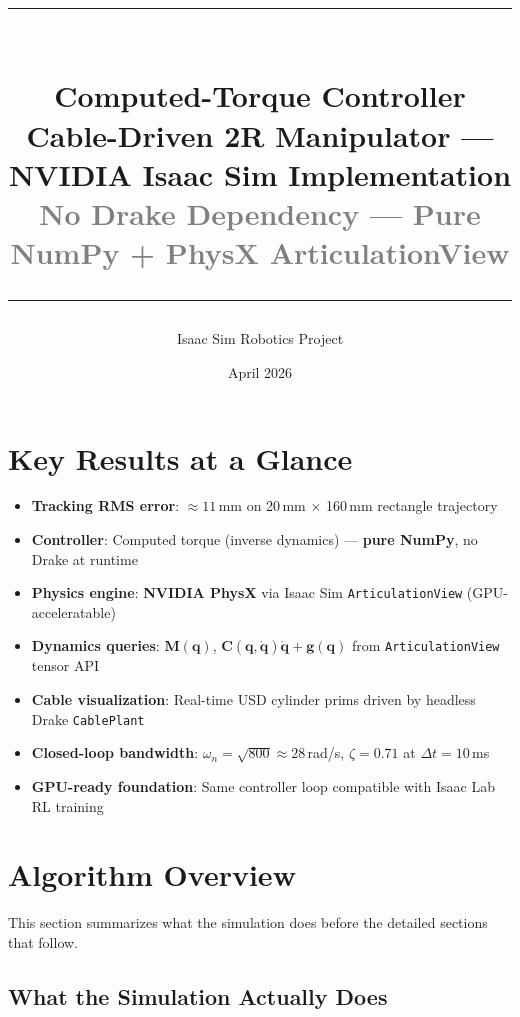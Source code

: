 \documentclass[11pt,a4paper]{article}
\title{%
    \textcolor{isaacorg}{\rule{\linewidth}{1.5pt}}\\[0.4cm]
    {\Huge\bfseries Computed-Torque Controller}\\[0.3cm]
    {\Large\textcolor{isaaccyan}{Cable-Driven 2R Manipulator --- NVIDIA Isaac Sim Implementation}}\\[0.1cm]
    {\large\textcolor{gray}{No Drake Dependency --- Pure NumPy + PhysX ArticulationView}}\\[0.2cm]
    \textcolor{isaacorg}{\rule{\linewidth}{1.5pt}}
}
\author{Isaac Sim Robotics Project}
\date{April 2026}
\newcommand{\bq}{\bm{q}}
\newcommand{\bdq}{\dot{\bm{q}}}
\newcommand{\bM}{\bm{M}}
\begin{document}
\maketitle
\thispagestyle{empty}

\section*{Key Results at a Glance}

\begin{resultbox}
\begin{itemize}[leftmargin=1.5em]
    \item \textbf{Tracking RMS error}: $\approx 11$\,mm on 20\,mm $\times$ 160\,mm rectangle trajectory
    \item \textbf{Controller}: Computed torque (inverse dynamics) --- \textbf{pure NumPy}, no Drake at runtime
    \item \textbf{Physics engine}: \textbf{NVIDIA PhysX} via Isaac Sim \texttt{ArticulationView} (GPU-acceleratable)
    \item \textbf{Dynamics queries}: $\bM(\bq)$, $\bm{C}(\bq,\bdq)\bdq + \bm{g}(\bq)$ from \texttt{ArticulationView} tensor API
    \item \textbf{Cable visualization}: Real-time USD cylinder prims driven by headless Drake \texttt{CablePlant}
    \item \textbf{Closed-loop bandwidth}: $\omega_n = \sqrt{800} \approx 28$\,rad/s, $\zeta = 0.71$ at $\Delta t = 10$\,ms
    \item \textbf{GPU-ready foundation}: Same controller loop compatible with Isaac Lab RL training
\end{itemize}
\end{resultbox}

\tableofcontents
\newpage

\section{Algorithm Overview}
\label{sec:overview}

This section summarizes what the simulation does before the detailed sections that follow.

\subsection{What the Simulation Actually Does}
\end{document}
